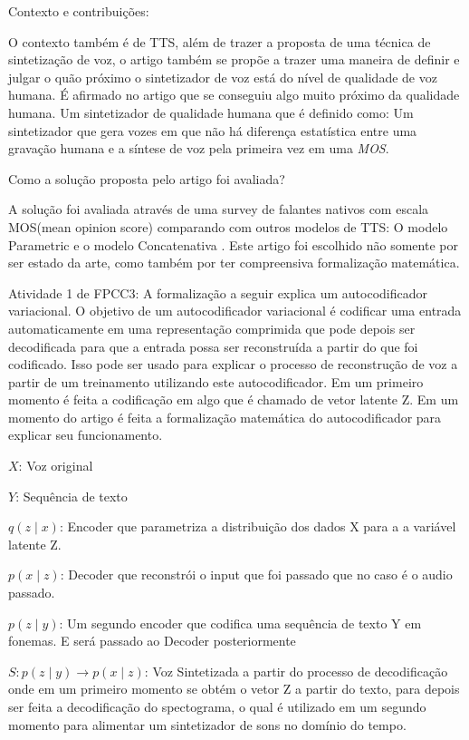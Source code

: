 \documentclass[a4paper,12pt]{article}
\begin{document}
			Contexto e contribuições:
						
			O contexto também é de TTS, além de trazer a proposta de uma técnica de sintetização de voz, o artigo também se propõe a trazer uma maneira de definir e julgar o quão próximo o sintetizador de voz está do nível de qualidade de voz humana. É afirmado no artigo que se conseguiu algo muito próximo da qualidade humana. Um sintetizador de qualidade humana que é definido como: Um sintetizador que gera vozes em que não há diferença estatística entre uma gravação humana e a síntese de voz pela primeira vez em uma \textit{MOS}.
			
			Como a solução proposta pelo artigo foi avaliada?
			
			A solução foi avaliada através de uma survey de falantes nativos com escala MOS(mean opinion score) comparando com outros modelos de TTS: O modelo Parametric \cite{zen2016parametric} e o modelo Concatenativa \cite{goncalvo2016concatenative}. Este artigo foi escolhido não somente por ser estado da arte, como também por ter compreensiva formalização matemática.
			
			Atividade 1 de FPCC3: A formalização a seguir explica um autocodificador variacional. O objetivo de um autocodificador variacional é codificar uma entrada automaticamente em uma representação comprimida que pode depois ser decodificada para que a entrada possa ser reconstruída a partir do que foi codificado. Isso pode ser usado para explicar o processo de reconstrução de voz a partir de um treinamento utilizando este autocodificador. Em um primeiro momento é feita a codificação em algo que é chamado de vetor latente Z. Em um momento do artigo é feita a formalização matemática do autocodificador para explicar seu funcionamento.

			$X$: Voz original
			
			$Y$: Sequência de texto
			
			$q(z \mid x)$: Encoder que parametriza a distribuição dos dados X para a a variável latente Z.
			
			$p(x \mid z)$: Decoder que reconstrói o input que foi passado que no caso é o audio passado.
				
			$p(z \mid y)$: Um segundo encoder que codifica uma sequência de texto Y em fonemas. E será passado ao Decoder posteriormente
			
			$S: p(z \mid y) \rightarrow  p(x \mid z)$: Voz Sintetizada a partir do processo de decodificação onde em um primeiro momento se obtém o vetor Z a partir do texto, para depois ser feita a decodificação do spectograma, o qual é utilizado em um segundo momento para alimentar um sintetizador de sons no domínio do tempo.
			
\end{document}
